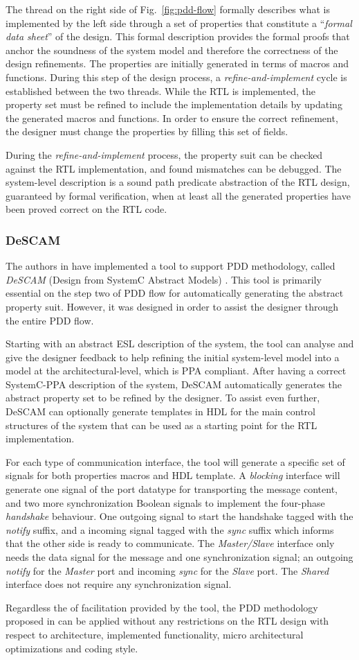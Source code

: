 The thread on the right side of Fig.~\ref{fig:pdd-flow} formally describes what is implemented by the left side through a set of properties that constitute a “\textit{formal data sheet}” of the design. This formal description provides the formal proofs that anchor the soundness of the system model and therefore the correctness of the design refinements. The properties are initially generated in terms of macros and functions. During this step of the design process, a \textit{refine-and-implement} cycle is established between the two threads. While the RTL is implemented, the property set must be refined to include the implementation details by updating the generated macros and functions. In order to ensure the correct refinement, the designer must change the properties by filling this set of fields.

During the \textit{refine-and-implement} process, the property suit can be checked against the RTL implementation, and found mismatches can be debugged. The system-level description is a sound path predicate abstraction of the RTL design, guaranteed by formal verification, when at least all the generated properties have been proved correct on the RTL code.

\subsubsection*{DeSCAM}

The authors in \cite{paper-pdd} have implemented a tool to support PDD methodology, called \textit{DeSCAM} (Design from SystemC Abstract Models) \cite{descam}. This tool is primarily essential on the step two of PDD flow for automatically generating the abstract property suit. However, it was designed in order to assist the designer through the entire PDD flow.

Starting with an abstract ESL description of the system, the tool can analyse and give the designer feedback to help refining the initial system-level model into a model at the architectural-level, which is PPA compliant. After having a correct SystemC-PPA description of the system, DeSCAM automatically generates the abstract property set to be refined by the designer. To assist even further, DeSCAM can optionally generate templates in HDL for the main control structures of the system that can be used as a starting point for the RTL implementation.

For each type of communication interface, the tool will generate a specific set of signals for both properties macros and HDL template. A \textit{blocking} interface will generate one signal of the port datatype for transporting the message content, and two more synchronization Boolean signals to implement the four-phase \textit{handshake} behaviour. One outgoing signal to start the handshake tagged with the \textit{notify} suffix, and a incoming signal tagged with the \textit{sync} suffix which informs that the other side is ready to communicate. The \textit{Master/Slave} interface only needs the data signal for the message and one synchronization signal; an outgoing \textit{notify} for the \textit{Master} port and incoming \textit{sync} for the \textit{Slave} port. The \textit{Shared} interface does not require any synchronization signal.

Regardless the of facilitation provided by the tool, the PDD methodology proposed in \cite{paper-pdd} can be applied without any restrictions on the RTL design with respect to architecture, implemented functionality, micro architectural optimizations and coding style. 
